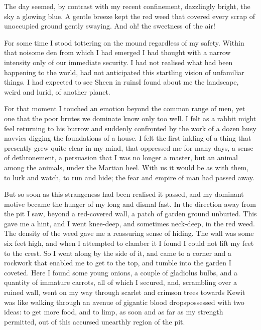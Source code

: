 The day seemed, by contrast with my recent confinement, dazzlingly
bright, the sky a glowing blue. A gentle breeze kept the red weed
that covered every scrap of unoccupied ground gently swaying. And
oh! the sweetness of the air!

For some time I stood tottering on the mound regardless of my
safety. Within that noisome den from which I had emerged I had
thought with a narrow intensity only of our immediate security. I
had not realised what had been happening to the world, had not
anticipated this startling vision of unfamiliar things. I had
expected to see Sheen in ruins\dash{}I found about me the landscape,
weird and lurid, of another planet.

For that moment I touched an emotion beyond the common range of
men, yet one that the poor brutes we dominate know only too well. I
felt as a rabbit might feel returning to his burrow and suddenly
confronted by the work of a dozen busy navvies digging the
foundations of a house. I felt the first inkling of a thing that
presently grew quite clear in my mind, that oppressed me for many
days, a sense of dethronement, a persuasion that I was no longer a
master, but an animal among the animals, under the Martian heel.
With us it would be as with them, to lurk and watch, to run and
hide; the fear and empire of man had passed away.

But so soon as this strangeness had been realised it passed, and my
dominant motive became the hunger of my long and dismal fast. In
the direction away from the pit I saw, beyond a red-covered wall, a
patch of garden ground unburied. This gave me a hint, and I went
knee-deep, and sometimes neck-deep, in the red weed. The density of
the weed gave me a reassuring sense of hiding. The wall was some
six feet high, and when I attempted to clamber it I found I could
not lift my feet to the crest. So I went along by the side of it,
and came to a corner and a rockwork that enabled me to get to the
top, and tumble into the garden I coveted. Here I found some young
onions, a couple of gladiolus bulbs, and a quantity of immature
carrots, all of which I secured, and, scrambling over a ruined
wall, went on my way through scarlet and crimson trees towards
Kew\dash{}it was like walking through an avenue of gigantic blood
drops\dash{}possessed with two ideas: to get more food, and to limp, as
soon and as far as my strength permitted, out of this accursed
unearthly region of the pit.

